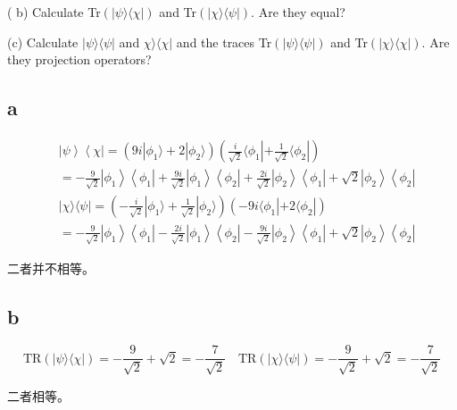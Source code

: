 \documentclass[dvipsnames, svgnames,a4paper,11pt]{article}
\begin{document}
( b)  Calculate Tr$( | \psi \rangle \langle \chi | )$ and Tr$(|\chi\rangle\langle\psi|).$ Are they equal?

(c) Calculate $|\psi\rangle\langle\psi|$ and $\chi\rangle\langle\chi|$ and the traces Tr$(|\psi\rangle\langle\psi|)$ and Tr$( | \chi \rangle \langle \chi | ) .$ Are they projection operators?

\subsection{a}$$\begin{aligned}
&\left|\psi\right\rangle\left\langle\chi\right| =(9i |\phi_{1}\rangle+2 |\phi_{2}\rangle)(\frac{i}{\sqrt{2}} \langle\phi_{1}|+\frac{1}{\sqrt{2}} \langle\phi_{2}|) \\
&=-\frac{9}{\sqrt{2}}\left|\phi_{1}\right\rangle\left\langle\phi_{1}\right|+\frac{9i}{\sqrt{2}}\left|\phi_{1}\right\rangle\left\langle\phi_{2}\right|+\frac{2i}{\sqrt{2}}\left|\phi_{2}\right\rangle\left\langle\phi_{1}\right|+\sqrt{2}\left|\phi_{2}\right\rangle\left\langle\phi_{2}\right| \\
&|\chi\rangle \langle\psi| =(-\frac{i}{\sqrt{2}} |\phi_{1}\rangle+\frac{1}{\sqrt{2}} |\phi_{2}\rangle)(-9i \langle\phi_{1}|+2 \langle\phi_{2}|) \\
&=-\frac{9}{\sqrt{2}}\left|\phi_{1}\right\rangle\left\langle\phi_{1}\right|-\frac{2i}{\sqrt{2}}\left|\phi_{1}\right\rangle\left\langle\phi_{2}\right|-\frac{9i}{\sqrt{2}}\left|\phi_{2}\right\rangle\left\langle\phi_{1}\right|+\sqrt{2}\left|\phi_{2}\right\rangle\left\langle\phi_{2}\right|
\end{aligned}$$

二者并不相等。

\subsection{b}

$$\mathrm{TR}(|\psi\rangle \langle\chi|)=-\frac{9}{\sqrt{2}}+\sqrt{2}=-\frac{7}{\sqrt{2}}\quad \mathrm{TR}(|\chi\rangle \langle\psi|)=-\frac{9}{\sqrt{2}}+\sqrt{2}=-\frac{7}{\sqrt{2}}$$

二者相等。
\end{document}
